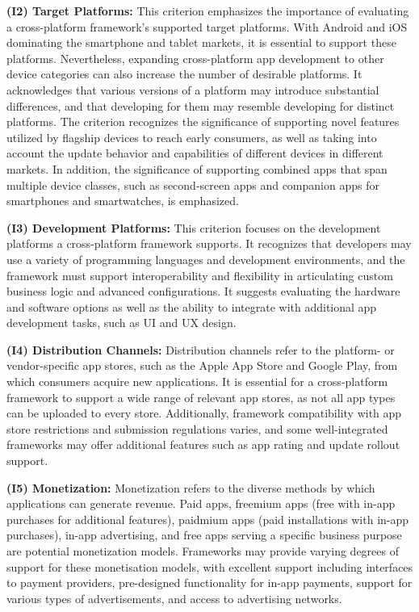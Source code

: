 \textbf{(I2) Target Platforms:} 
This criterion emphasizes the importance of evaluating a cross-platform framework's supported target platforms. With Android and iOS dominating the smartphone and tablet markets, it is essential to support these platforms. Nevertheless, expanding cross-platform app development to other device categories can also increase the number of desirable platforms. It acknowledges that various versions of a platform may introduce substantial differences, and that developing for them may resemble developing for distinct platforms. The criterion recognizes the significance of supporting novel features utilized by flagship devices to reach early consumers, as well as taking into account the update behavior and capabilities of different devices in different markets. In addition, the significance of supporting combined apps that span multiple device classes, such as second-screen apps and companion apps for smartphones and smartwatches, is emphasized.

\textbf{(I3) Development Platforms:} 
This criterion focuses on the development platforms a cross-platform framework supports. It recognizes that developers may use a variety of programming languages and development environments, and the framework must support interoperability and flexibility in articulating custom business logic and advanced configurations. It suggests evaluating the hardware and software options as well as the ability to integrate with additional app development tasks, such as UI and UX design.

\textbf{(I4) Distribution Channels:} 
Distribution channels refer to the platform- or vendor-specific app stores, such as the Apple App Store and Google Play, from which consumers acquire new applications. It is essential for a cross-platform framework to support a wide range of relevant app stores, as not all app types can be uploaded to every store. Additionally, framework compatibility with app store restrictions and submission regulations varies, and some well-integrated frameworks may offer additional features such as app rating and update rollout support.

\textbf{(I5) Monetization:}
Monetization refers to the diverse methods by which applications can generate revenue. Paid apps, freemium apps (free with in-app purchases for additional features), paidmium apps (paid installations with in-app purchases), in-app advertising, and free apps serving a specific business purpose are potential monetization models. Frameworks may provide varying degrees of support for these monetisation models, with excellent support including interfaces to payment providers, pre-designed functionality for in-app payments, support for various types of advertisements, and access to advertising networks.

